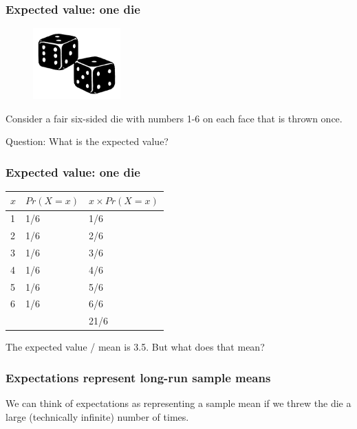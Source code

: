 \documentclass{beamer}
\begin{document}
	\begin{frame}
		\frametitle{Expected value: one die}
		
		\begin{figure}[ht]
			\centerline{\includegraphics[width=0.3\textwidth]{./figures/dice.png}}
		\end{figure}
		
		Consider a fair six-sided die with numbers 1-6 on each face that is thrown once.
		
		
		Question: What is the expected value?
		
	\end{frame}
	
	\begin{frame}
		\frametitle{Expected value: one die}
		
		\begin{table}[]
			\begin{tabular}{lll}
				$x$ & $Pr(X=x)$ & $x \times Pr(X=x)$ \\
				\midrule
				1 & 1/6     & 1/6       \\
				2 & 1/6     & 2/6       \\
				3 & 1/6     & 3/6       \\
				4 & 1/6     & 4/6       \\
				5 & 1/6     & 5/6       \\
				6 & 1/6     & 6/6       \\
				\midrule
				&         & 21/6
			\end{tabular}
		\end{table}
				
		The expected value / mean is 3.5. But what does that mean?
				
	\end{frame}

	\begin{frame}
		\frametitle{Expectations represent long-run sample means}
		
		We can think of expectations as representing a sample mean if we threw the die a large (technically infinite) number of times.
		
			\begin{figure}[t]
				\centerline{}
			\end{figure}
		
	\end{frame}
	
\end{document}
